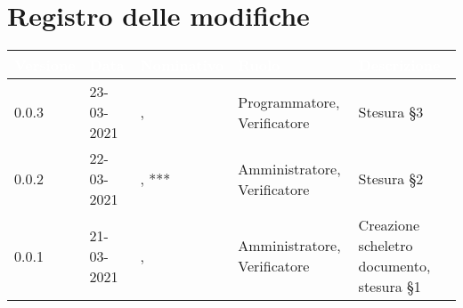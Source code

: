 \section*{Registro delle modifiche}
\setcounter{table}{-1}
{
\renewcommand{\arraystretch}{1.5}
\centering
\begin{longtable}{C{1.7cm} | C{2.2cm} | C{3.2cm} | C{3cm} | C{4.8cm}}
\textcolor{white}{\textbf{Versione}}&
\textcolor{white}{\textbf{Data}}&
\textcolor{white}{\textbf{Nominativo}}&
\textcolor{white}{\textbf{Ruolo}}&
\textcolor{white}{\textbf{Descrizione}}\\	
\endhead

0.0.3 & 23-03-2021 & \RA{},     & Programmatore, Verificatore & Stesura \S 3 \\
0.0.2 & 22-03-2021 & \SP{}, *** & Amministratore, Verificatore & Stesura \S 2 \\	
0.0.1 & 21-03-2021 & \ZM{}, \SP{} & Amministratore, Verificatore & Creazione scheletro documento, stesura \S 1\\
		
\end{longtable}
}